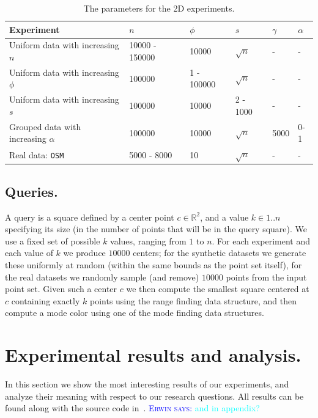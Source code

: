 \documentclass[twoside,leqno,twocolumn]{article}
\newcommand{\R} {\mathbb{R}\xspace}
\newcommand{\myremark}[4]{\textcolor{blue}{\textsc{#1 #2: }}\textcolor{#4}{\textsf{#3}}}
\newcommand{\erwin}[2][says]{\myremark{Erwin}{#1}{#2}{cyan}}
\begin{document}
\begin{table}[h]
\centering
\begin{tabular}{llllll}
\toprule
Experiment                            & $n$               & $\phi$      & $s$        & $\gamma$ & $\alpha$  \\
\midrule
Uniform data with increasing $n$      & \num{10000} - \num{150000}  & \num{10000}      & $\sqrt{n}$ & -        & -         \\
Uniform data with increasing $\phi$   & \num{100000}           & \num{1} - \num{100000} & $\sqrt{n}$ & -        & -         \\
Uniform data with increasing $s$      & \num{100000}           & \num{10000}      & \num{2} - \num{1000}   & -        & -         \\
Grouped data with increasing $\alpha$ & \num{100000}           & \num{10000}      & $\sqrt{n}$ & \num{5000}    & \num{0}-\num{1}       \\
Real data: \texttt{OSM}                       & \num{5000} - \num{8000}  & \num{10}            & $\sqrt{n}$ & -        & -         \\
\bottomrule
\end{tabular}
\caption{The parameters for the 2D experiments.}
\label{tab:exp2D}
\end{table}


\subsection{Queries.}
A query is a square defined by a center point $c \in \R^2$, and a value
$k \in 1..n$ specifying its size (in the number of points that will be
in the query square). We use a fixed set of possible $k$ values,
ranging from $1$ to $n$. For each experiment and each value of $k$ we
produce $10000$ centers; for the synthetic datasets we generate these
uniformly at random (within the same bounds as the point set itself),
for the real datasets we randomly sample (and
remove) $10000$ points from the input point set. Given such a
center $c$ we then compute the smallest square centered at $c$ containing
exactly $k$ points using the range finding data structure, and then
compute a mode color using one of the mode finding data structures.




\section{Experimental results and analysis.}
\label{sec:Experimental_Results}
In this section we show the most interesting results of our
experiments, and analyze their meaning with respect to our research
questions. All results can be found along with the source code
in~\cite{code}. \erwin{and in appendix?}
\end{document}
